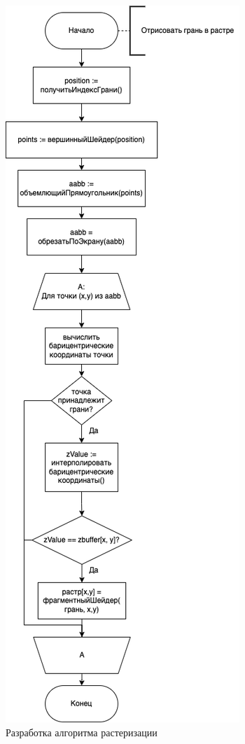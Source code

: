 \begin{figure}[H]
	\centering
	\includegraphics[height=0.95\textheight]{img/diagrams-rasterizer.drawio.png}
	\caption{Разработка алгоритма растеризации}
	\label{fig:diagram_count}
\end{figure}


